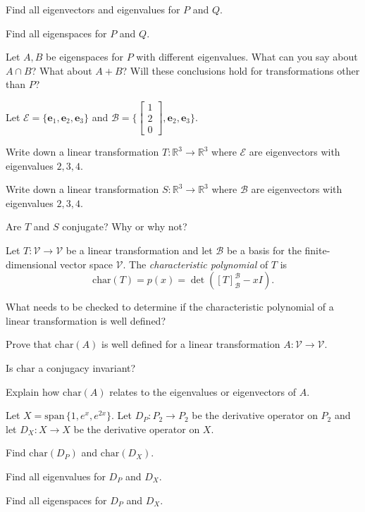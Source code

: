 \documentclass[14pt]{problemset}
\newcommand{\xh}{{{\mathbf e}_1}}
\newcommand{\yh}{{{\mathbf e}_2}}
\newcommand{\zh}{{{\mathbf e}_3}}
\newcommand{\R}{\mathbb{R}}
\newcommand{\Span}{\mathrm{span}\,}
\newcommand{\mat}[1]{\begin{bmatrix}#1\end{bmatrix}}
\newcommand{\Char}{\mathrm{char}}
\begin{document}
	\begin{parts}
		\item Find all eigenvectors and eigenvalues for $P$ and $Q$.
		\item Find all eigenspaces for $P$ and $Q$.
		\item Let $A,B$ be eigenspaces for $P$ with different eigenvalues.
			What can you say about $A\cap B$? What about $A+B$? Will
			these conclusions hold for transformations other than $P$?
	\end{parts}

	\newpage
	\question
	Let $\mathscr E=\{\xh,\yh,\zh\}$ and $\mathscr B=\{\mat{1\\2\\0},\yh,\zh\}$.
	\begin{parts}
		\item Write down a linear transformation $T:\R^3\to\R^3$ where $\mathscr E$ are eigenvectors
			with eigenvalues $2,3,4$.
		\item Write down a linear transformation $S:\R^3\to\R^3$ where $\mathscr B$ are eigenvectors
			with eigenvalues $2,3,4$.
		\item Are $T$ and $S$ conjugate? Why or why not?
	\end{parts}

	\begin{definition}
		Let $T:\mathcal V\to\mathcal V$ be a linear transformation and let $\mathscr B$ be a basis for 
		the finite-dimensional vector space $\mathcal V$. The \emph{characteristic
		polynomial} of $T$ is 
		\[
			\Char(T) = p(x) =\det([T]_{\mathscr B}^{\mathscr B} - xI).
		\]
	\end{definition}

	\question
	\begin{parts}
		\item What needs to be checked to determine if the characteristic polynomial
			of a linear transformation is well defined?
		\item Prove that $\Char(A)$ is well defined for a linear transformation $A:\mathcal V\to\mathcal V$.
		\item Is $\Char$ a conjugacy invariant?
		\item Explain how $\Char(A)$ relates to the eigenvalues or eigenvectors of $A$.
	\end{parts}

	\question
	Let $X=\Span\{1,e^x,e^{2x}\}$.
	Let $D_P:P_2\to P_2$ be the derivative operator on $P_2$ and let $D_X:X\to X$ be the derivative
	operator on $X$.
	\begin{parts}
		\item Find $\Char(D_P)$ and $\Char(D_X)$.
		\item Find all eigenvalues for $D_P$ and $D_X$.
		\item Find all eigenspaces for $D_P$ and $D_X$.
	\end{parts}
\end{document}
